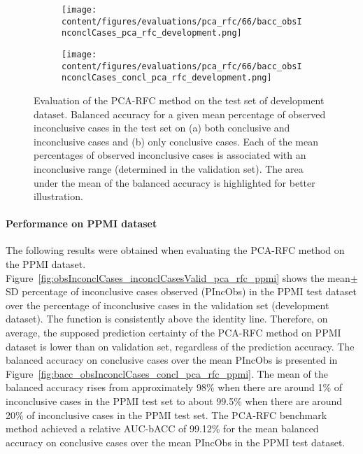 \begin{figure}[ht]
  \begin{subfigure}{0.5\textwidth}
    \centering
    \texttt{[image: content/figures/evaluations/pca\_rfc/66/bacc\_obsInconclCases\_pca\_rfc\_development.png]}
    \subcaption{}
    \label{fig:bacc_obsInconclCases_pca_rfc_development}
  \end{subfigure}
  \hfill
  \begin{subfigure}{0.5\textwidth}
    \centering
    \texttt{[image: content/figures/evaluations/pca\_rfc/66/bacc\_obsInconclCases\_concl\_pca\_rfc\_development.png]}
    \subcaption{}
    \label{fig:bacc_obsInconclCases_concl_pca_rfc_development}
  \end{subfigure}

  \caption{Evaluation of the PCA-RFC method on the test set of development dataset.
  Balanced accuracy for a given mean percentage of observed inconclusive cases in the test set on 
  (a) both conclusive and inconclusive cases and (b) only conclusive cases. 
  Each of the mean percentages of observed inconclusive cases is associated with an inconclusive range (determined in the validation set). 
  The area under the mean of the balanced accuracy is highlighted for better illustration.}
  \label{fig:bacc_obsInconclCases_pca_rfc_development_full}
\end{figure}




\paragraph{Performance on PPMI dataset}

The following results were obtained when evaluating the PCA-RFC method on the PPMI dataset.
Figure~\ref{fig:obsInconclCases_inconclCasesValid_pca_rfc_ppmi} shows the
mean$\pm$SD percentage of inconclusive cases observed (PIncObs) in the PPMI test dataset 
over the percentage of inconclusive cases in the validation set (development dataset).
The function is consistently above the identity line.
Therefore, on average, the supposed prediction certainty of the PCA-RFC method on PPMI dataset is lower than on validation set,
regardless of the prediction accuracy.
The balanced accuracy on conclusive cases over the mean PIncObs is presented 
in Figure~\ref{fig:bacc_obsInconclCases_concl_pca_rfc_ppmi}.
The mean of the balanced accuracy rises from approximately 98\% 
when there are around 1\% of inconclusive cases in the PPMI test set to about 99.5\% 
when there are around 20\% of inconclusive cases in the PPMI test set.
The PCA-RFC benchmark method achieved a relative AUC-bACC of 99.12\% for the mean balanced accuracy on conclusive cases 
over the mean PIncObs in the PPMI test dataset.

